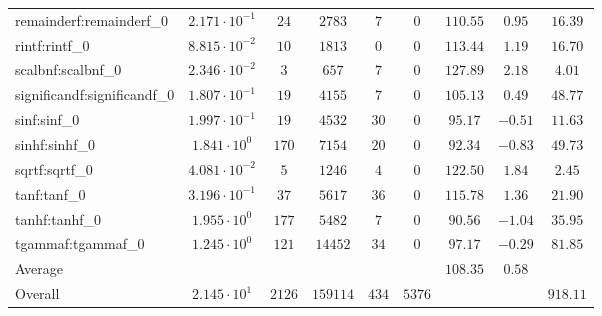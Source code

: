 \begin{tabular}{|l|c|c|c|c|c|c|c|c|}
remainderf:remainderf\_0     & $ 2.171 \cdot 10^{-1} $ & $ 24     $ & $ 2783   $ & $ 7   $ & $ 0    $ & $ 110.55      $ & $ 0.95    $ & $ 16.39   $ \\
rintf:rintf\_0               & $ 8.815 \cdot 10^{-2} $ & $ 10     $ & $ 1813   $ & $ 0   $ & $ 0    $ & $ 113.44      $ & $ 1.19    $ & $ 16.70   $ \\
scalbnf:scalbnf\_0           & $ 2.346 \cdot 10^{-2} $ & $ 3      $ & $ 657    $ & $ 7   $ & $ 0    $ & $ 127.89      $ & $ 2.18    $ & $ 4.01    $ \\
significandf:significandf\_0 & $ 1.807 \cdot 10^{-1} $ & $ 19     $ & $ 4155   $ & $ 7   $ & $ 0    $ & $ 105.13      $ & $ 0.49    $ & $ 48.77   $ \\
sinf:sinf\_0                 & $ 1.997 \cdot 10^{-1} $ & $ 19     $ & $ 4532   $ & $ 30  $ & $ 0    $ & $ 95.17       $ & $ -0.51   $ & $ 11.63   $ \\
sinhf:sinhf\_0               & $ 1.841 \cdot 10^{0}  $ & $ 170    $ & $ 7154   $ & $ 20  $ & $ 0    $ & $ 92.34       $ & $ -0.83   $ & $ 49.73   $ \\
sqrtf:sqrtf\_0               & $ 4.081 \cdot 10^{-2} $ & $ 5      $ & $ 1246   $ & $ 4   $ & $ 0    $ & $ 122.50      $ & $ 1.84    $ & $ 2.45    $ \\
tanf:tanf\_0                 & $ 3.196 \cdot 10^{-1} $ & $ 37     $ & $ 5617   $ & $ 36  $ & $ 0    $ & $ 115.78      $ & $ 1.36    $ & $ 21.90   $ \\
tanhf:tanhf\_0               & $ 1.955 \cdot 10^{0}  $ & $ 177    $ & $ 5482   $ & $ 7   $ & $ 0    $ & $ 90.56       $ & $ -1.04   $ & $ 35.95   $ \\
tgammaf:tgammaf\_0           & $ 1.245 \cdot 10^{0}  $ & $ 121    $ & $ 14452  $ & $ 34  $ & $ 0    $ & $ 97.17       $ & $ -0.29   $ & $ 81.85   $ \\
\hline
Average                      & $                     $ & $        $ & $        $ & $     $ & $      $ & $ 108.35      $ & $ 0.58    $ & $         $ \\
\hline
Overall                      & $ 2.145 \cdot 10^{1}  $ & $ 2126   $ & $ 159114 $ & $ 434 $ & $ 5376 $ & $             $ & $         $ & $ 918.11  $ \\
\hline
\end{tabular}
